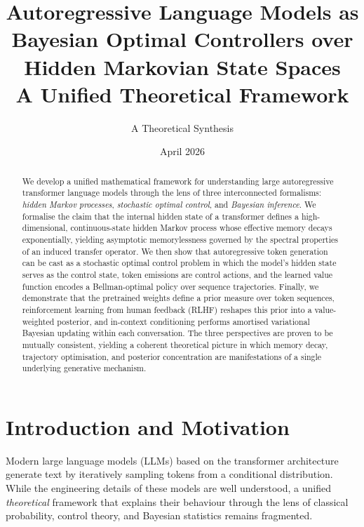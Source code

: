 \documentclass[11pt,a4paper]{article}
\title{%
  \textbf{Autoregressive Language Models as\\
  Bayesian Optimal Controllers over\\
  Hidden Markovian State Spaces}\\[0.6em]
  \large A Unified Theoretical Framework
}
\author{%
  A Theoretical Synthesis
}
\date{April 2026}
\theoremstyle{plain}
\theoremstyle{definition}
\theoremstyle{remark}
\begin{document}
\maketitle

\begin{abstract}
We develop a unified mathematical framework for understanding large autoregressive
transformer language models through the lens of three interconnected formalisms:
\emph{hidden Markov processes}, \emph{stochastic optimal control}, and
\emph{Bayesian inference}. We formalise the claim that the internal hidden state
of a transformer defines a high-dimensional, continuous-state hidden Markov
process whose effective memory decays exponentially, yielding asymptotic
memorylessness governed by the spectral properties of an induced transfer
operator. We then show that autoregressive token generation can be cast as a
stochastic optimal control problem in which the model's hidden state serves as
the control state, token emissions are control actions, and the learned value
function encodes a Bellman-optimal policy over sequence trajectories. Finally, we
demonstrate that the pretrained weights define a prior measure over token
sequences, reinforcement learning from human feedback (RLHF) reshapes this prior
into a value-weighted posterior, and in-context conditioning performs amortised
variational Bayesian updating within each conversation. The three perspectives
are proven to be mutually consistent, yielding a coherent theoretical picture in
which memory decay, trajectory optimisation, and posterior concentration are
manifestations of a single underlying generative mechanism.
\end{abstract}

\tableofcontents
\newpage

\section{Introduction and Motivation}\label{sec:intro}

Modern large language models (LLMs) based on the transformer architecture
generate text by iteratively sampling tokens from a conditional distribution.
While the engineering details of these models are well understood, a unified
\emph{theoretical} framework that explains their behaviour through the lens of
classical probability, control theory, and Bayesian statistics remains
fragmented.
\end{document}
